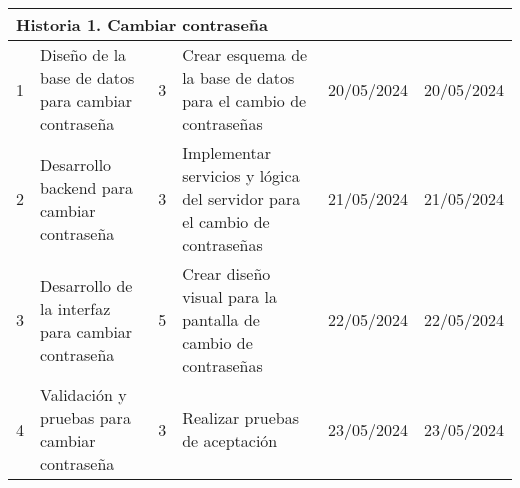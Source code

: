 \begin{longtable}{|p{0.5cm}|p{2cm}|p{1cm}|p{3cm}|p{1cm}|p{1cm}|}
    \multicolumn{6}{|l|}{\textbf{Historia 1. Cambiar contraseña}}                                                                                                                                                                                                                                                                                                                            \\ \hline
    1                                        & Diseño de la base de datos para cambiar contraseña   & 3                                                              & Crear esquema de la base de datos para el cambio de contraseñas                 & 20/05/2024                                                    & 20/05/2024                                                          \\ \hline
    2                                        & Desarrollo backend para cambiar contraseña           & 3                                                              & Implementar servicios y lógica del servidor para el cambio de contraseñas       & 21/05/2024                                                    & 21/05/2024                                                          \\ \hline
    3                                        & Desarrollo de la interfaz para cambiar contraseña    & 5                                                              & Crear diseño visual para la pantalla de cambio de contraseñas                   & 22/05/2024                                                    & 22/05/2024                                                          \\ \hline
    4                                        & Validación y pruebas para cambiar contraseña         & 3                                                              & Realizar pruebas de aceptación                                                  & 23/05/2024                                                    & 23/05/2024                                                          \\ \hline


\end{longtable}

